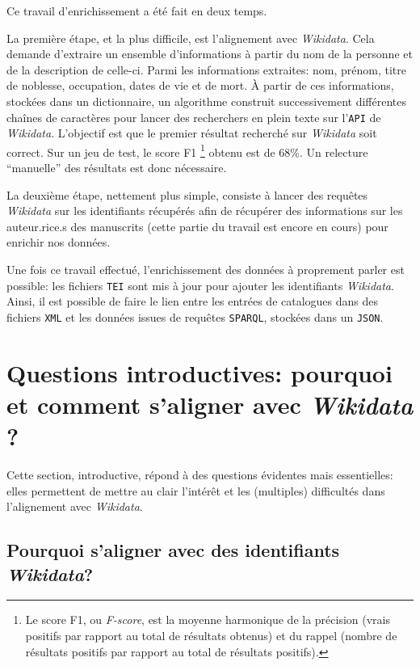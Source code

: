 \documentclass[a4paper, 12pt, twoside]{book}
\newcommand{\scl}[1]{%
	#1%
	\ifthenelse{\equal{#1}{I}}{\up{er}}{\up{ème}}%
	~s.%
}
\newcommand{\api}{\texttt{API}}
\newcommand{\json}{\texttt{JSON}}
\newcommand{\sparql}{\texttt{SPARQL}}
\newcommand{\tei}{\texttt{TEI}}
\newcommand{\xml}{\texttt{XML}}
\newcommand{\wkd}{\textit{Wikidata}}
\begin{document}
Ce travail d'enrichissement a été fait en deux temps. 

La première étape, et la plus difficile, est l'alignement avec \wkd{}. Cela demande d'extraire un ensemble d'informations à partir du nom de la personne et de la description de celle-ci. Parmi les informations extraites: nom, prénom, titre de noblesse, occupation, dates de vie et de mort. À partir de ces informations, stockées dans un dictionnaire, un algorithme construit successivement différentes chaînes de caractères pour lancer des recherchers en plein texte sur l'\api{} de \wkd{}. L'objectif est que le premier résultat recherché sur \wkd{} soit correct. Sur un jeu de test, le score F1 \footnote{Le score F1, ou \textit{F-score}, est la moyenne harmonique de la précision (vrais positifs par rapport au total de résultats obtenus) et du rappel (nombre de résultats positifs par rapport au total de résultats positifs).\cite{noauthor_precision_2022}} obtenu est de 68\%. Un relecture \enquote{manuelle} des résultats est donc nécessaire.

La deuxième étape, nettement plus simple, consiste à lancer des requêtes \wkd{} sur les identifiants récupérés afin de récupérer des informations sur les auteur.rice.s des manuscrits (cette partie du travail est encore en cours) pour enrichir nos données.

Une fois ce travail effectué, l'enrichissement des données à proprement parler est possible: les fichiers \tei{} sont mis à jour pour ajouter les identifiants \wkd{}. Ainsi, il est possible de faire le lien entre les entrées de catalogues dans des fichiers \xml{} et les données issues de requêtes \sparql{}, stockées dans un \json.


\section{Questions introductives: pourquoi et comment s'aligner avec \wkd{} ?}
Cette section, introductive, répond à des questions évidentes mais essentielles: elles permettent de mettre au clair l'intérêt et les (multiples) difficultés dans l'alignement avec \wkd{}.

\subsection{Pourquoi s'aligner avec des identifiants \wkd{}?} 
\end{document}
